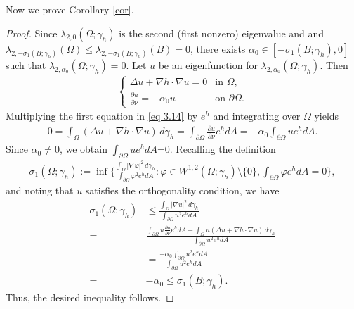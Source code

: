 \documentclass[11pt,leqno]{amsart}
\numberwithin{equation}{section}
\begin{document}
Now we prove Corollary \ref{cor}.
\begin{proof}
    Since $\lambda_{2,0}(\Omega; \gamma_h)$ is the second (first nonzero) eigenvalue and
  and $\lambda_{2,-\sigma_{1}(B;\gamma_h)}(\Omega)\leq \lambda_{2,-\sigma_{1}(B;\gamma_h)}(B)=0$, there exists $\alpha_{0}\in [-\sigma_{1}(B;\gamma_h),0]$ such that  $\lambda_{2,\alpha_{0}}(\Omega;\gamma_h)=0$.
Let $u$ be an eigenfunction for $\lambda_{2,\alpha_{0}}(\Omega;\gamma_h)$. Then 
\begin{align}\label{eq 3.14}
    \begin{cases}
\Delta u+\nabla h\cdot \nabla u = 0 & \text{in } \Omega, \\
\frac{\partial u}{\partial \nu} = -\alpha_0 u & \text{on } \partial \Omega.
\end{cases}
\end{align}
Multiplying the first equation in \eqref{eq 3.14} by $e^{h}$ and integrating over $\Omega$ yields
\begin{align*}
    0=\int_{\Omega}(\Delta u+\nabla h\cdot \nabla u)\, d\gamma_h=\int_{\partial \Omega}\frac{\partial u}{\partial \nu}e^{h}dA=-\alpha_{0}\int_{\partial \Omega}u e^{h}dA.
\end{align*}
Since $\alpha_{0}\neq 0$, we obtain $\int_{\partial \Omega}u e^{h}dA$=0.
Recalling the definition
\begin{align*}
    \sigma_{1}(\Omega; \gamma_h):=\inf \{ \frac{\int_{\Omega}|\nabla \varphi|^{2}\, d\gamma_h}{\int_{\partial\Omega}\varphi^{2}e^{h}dA}: \varphi\in W^{1,2}(\Omega; \gamma_h)\setminus\{0\},\int_{\partial \Omega}\varphi e^{h}dA=0\},
\end{align*}
and noting that $u$ satisfies the orthogonality condition, we have
\begin{align*}
    \sigma_{1}(\Omega;\gamma_h)&\leq \frac{\int_{\Omega}|\nabla u|^{2}\, d\gamma_h}{\int_{\partial\Omega}u^{2}e^{h}dA}\\
    =&\frac{\int_{\partial\Omega}u\frac{\partial u}{\partial \nu} e^{h}dA-\int_{\Omega}u(\Delta u+\nabla h\cdot \nabla u)\, d\gamma_h}{\int_{\partial\Omega}u^{2}e^{h}dA}\\
    &=\frac{-\alpha_{0}\int_{\partial \Omega}u^{2}e^{h}dA}{\int_{\partial\Omega}u^{2}e^{h}dA}\\
    =&-\alpha_{0}
    \leq \sigma_{1}(B;\gamma_h).
\end{align*}
Thus, the desired inequality follows. 
\end{proof}
\end{document}
